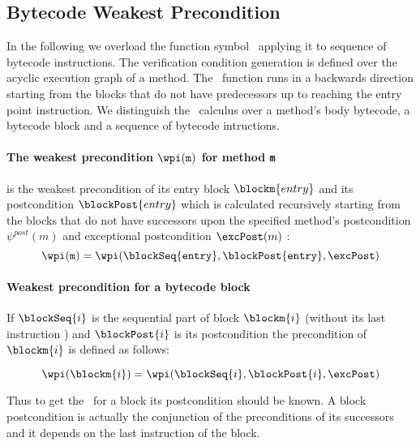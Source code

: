 

\subsection{Bytecode Weakest Precondition}\label{wpGraph}

In the following we overload the function symbol \wpi \ applying it to sequence of bytecode instructions.
 The verification condition generation is defined over the acyclic execution graph of a method. 
The \wpi \ function runs in a backwards direction starting from the blocks that do not have predecessors up to reaching the entry point
 instruction. We distinguish the \wpi \ calculus over  a method's body bytecode, a bytecode block and a sequence of bytecode intructions.

\paragraph{The weakest precondition $\wpi(\tt{m})$ for method \texttt{m}}  is the weakest precondition of its entry block $\blockm{entry}$ and its postcondition $\blockPost{entry}$ which is calculated recursively starting from the blocks that do not have successors upon the specified method's postcondition  $\psi^{post}(m)$ and exceptional postcondition $\excPost (m)$ :
 $$\wpi(\tt{m}) = \wpi(\blockSeq{entry}, \blockPost{entry}, \excPost ) $$

\paragraph{Weakest precondition for a bytecode block} If $\blockSeq{i}$ is the sequential part of block $\blockm{i}$ (without its last instruction ) and  $\blockPost{i}$ is its postcondition the precondition of $\blockm{i}$ is defined as follows:

$$ \wpi(\blockm{i}) = \wpi( \blockSeq{i}, \blockPost{i}, \excPost ) $$
 
Thus to get the \wpi \ for a block its postcondition should be known. A block postcondition is actually the conjunction of the preconditions
of its successors and it depends on the last instruction of the block.

